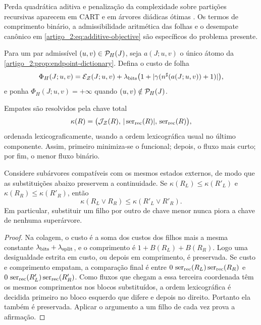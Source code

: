 Perda quadrática aditiva e penalização da complexidade sobre partições
recursivas aparecem em CART e em árvores diádicas ótimas
\citep{artigo_2-breiman1984,artigo_2-donoho1997,artigo_2-blanchard2007}. Os termos de comprimento binário,
a admissibilidade aritmética das folhas e o desempate canônico em
\eqref{artigo_2:eq:additive-objective} são específicos do problema presente.

Para um par admissível $(u,v)\in\mathcal{P}_H(J)$, seja $a(J;u,v)$ o único átomo
da \cref{artigo_2:prop:endpoint-dictionary}. Defina o custo de folha
\begin{equation}
 \Phi_H(J;u,v)=
 \mathcal{E}_{\mathcal Z}(J;u,v)
 +\lambda_{\rm bits}
  \bigl(1+|\gamma(n^\sharp(a(J;u,v))+1)|\bigr),
 \label{artigo_2:eq:leaf-cost}
\end{equation}
e ponha $\Phi_H(J;u,v)=+\infty$ quando $(u,v)\notin\mathcal{P}_H(J)$.

Empates são resolvidos pela chave total
\begin{equation}
 \kappa(R)=
 \bigl(\mathcal{J}_{\mathcal Z}(R),\,
       |\operatorname{ser}_{\rm rec}(R)|,\,
       \operatorname{ser}_{\rm rec}(R)\bigr),
 \label{artigo_2:eq:tie-key}
\end{equation}
ordenada lexicograficamente, usando a ordem lexicográfica usual no último
componente. Assim, primeiro minimiza-se o funcional; depois, o fluxo mais
curto; por fim, o menor fluxo binário.

\begin{lemma}\label{map:artigo_2:5.2}
\label{artigo_2:lem:tie-concatenation}
Considere subárvores compatíveis com os mesmos estados externos, de modo que
as substituições abaixo preservem a continuidade. Se
$\kappa(R_L)\le\kappa(R'_L)$ e $\kappa(R_R)\le\kappa(R'_R)$, então
\[
 \kappa(R_L\vee R_R)\le\kappa(R'_L\vee R'_R).
\]
Em particular, substituir um filho por outro de chave menor nunca piora a
chave de nenhuma superárvore.
\end{lemma}

\begin{proof}
Na colagem, o custo é a soma dos custos dos filhos mais a mesma constante
$\lambda_{\rm bits}+\lambda_{\rm split}$, e o comprimento é
$1+B(R_L)+B(R_R)$. Logo uma desigualdade estrita em custo, ou depois em
comprimento, é preservada. Se custo e comprimento empatam, a comparação final
é entre
$0\,\operatorname{ser}_{\rm rec}(R_L)\operatorname{ser}_{\rm rec}(R_R)$ e
$0\,\operatorname{ser}_{\rm rec}(R'_L)\operatorname{ser}_{\rm rec}(R'_R)$. Como fluxos que chegam a essa
terceira coordenada têm os mesmos comprimentos nos blocos substituídos, a
ordem lexicográfica é decidida primeiro no bloco esquerdo que difere e depois
no direito. Portanto ela também é preservada. Aplicar o argumento a um filho
de cada vez prova a afirmação.
\end{proof}


